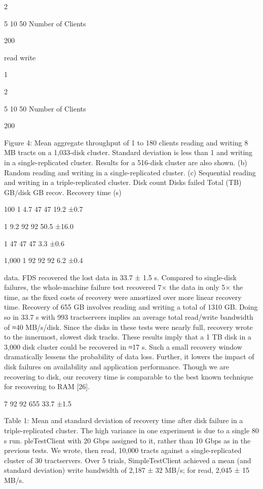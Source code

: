 2

5 10
50
Number of Clients

200

read
write

1

2

5 10
50
Number of Clients

200

Figure 4: Mean aggregate throughput of 1 to 180 clients reading and writing 8 MB tracts on a 1,033-disk cluster.
Standard deviation is less than 1%
and writing in a single-replicated cluster. Results for a 516-disk cluster are also shown. (b) Random reading and
writing in a single-replicated cluster. (c) Sequential reading and writing in a triple-replicated cluster.
Disk count
Disks failed
Total (TB)
GB/disk
GB recov.
Recovery
time (s)

100
1
4.7
47
47
19.2
±0.7

1
9.2
92
92
50.5
±16.0

1
47
47
47
3.3
±0.6

1,000
1
92
92
92
6.2
±0.4

data. FDS recovered the lost data in 33.7 ± 1.5 s. Compared to single-disk failures, the whole-machine failure
test recovered 7× the data in only 5× the time, as the
fixed costs of recovery were amortized over more linear
recovery time.
Recovery of 655 GB involves reading and writing a
total of 1310 GB. Doing so in 33.7 s with 993 tractservers implies an average total read/write bandwidth of
≈40 MB/s/disk. Since the disks in these tests were nearly
full, recovery wrote to the innermost, slowest disk tracks.
These results imply that a 1 TB disk in a 3,000 disk
cluster could be recovered in ≈17 s. Such a small recovery window dramatically lessens the probability of data
loss. Further, it lowers the impact of disk failures on
availability and application performance. Though we are
recovering to disk, our recovery time is comparable to
the best known technique for recovering to RAM [26].

7
92
92
655
33.7
±1.5

Table 1: Mean and standard deviation of recovery time
after disk failure in a triple-replicated cluster. The high
variance in one experiment is due to a single 80 s run.
pleTestClient with 20 Gbps assigned to it, rather than
10 Gbps as in the previous tests. We wrote, then read,
10,000 tracts against a single-replicated cluster of 30
tractservers. Over 5 trials, SimpleTestClient achieved
a mean (and standard deviation) write bandwidth of
2,187 ± 32 MB/s; for read, 2,045 ± 15 MB/s.

